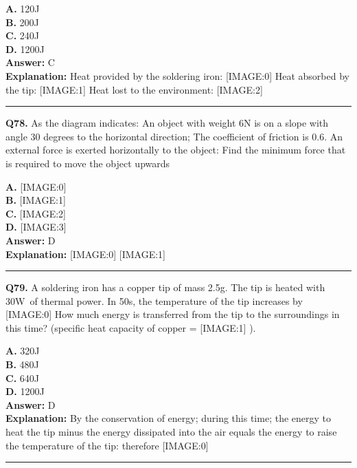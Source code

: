 \documentclass[12pt]{article}
\begin{document}
\textbf{A.} 120J \\
\textbf{B.} 200J \\
\textbf{C.} 240J \\
\textbf{D.} 1200J \\

\textbf{Answer:} C \\
\textbf{Explanation:} Heat provided by the soldering iron:
[IMAGE:0]
Heat absorbed by the tip:
[IMAGE:1]
Heat lost to the environment:
[IMAGE:2]

\hrule
\vspace{1em}


\noindent
\textbf{Q78.} As the diagram indicates: An object with weight 6N is on a slope with angle 30 degrees to the horizontal direction; The coefficient of friction is 0.6. An external force is exerted horizontally to the object: Find the minimum force that is required to move the object upwards



\textbf{A.} [IMAGE:0] \\
\textbf{B.} [IMAGE:1] \\
\textbf{C.} [IMAGE:2] \\
\textbf{D.} [IMAGE:3] \\

\textbf{Answer:} D \\
\textbf{Explanation:} [IMAGE:0]
[IMAGE:1]

\hrule
\vspace{1em}


\noindent
\textbf{Q79.} A soldering iron has a copper tip of mass 2.5g.
The tip is heated with 30W of thermal power. In 50s, the temperature of the tip increases by
[IMAGE:0]
How much energy is transferred from the tip to the surroundings in this time? (specific heat capacity of copper =
[IMAGE:1]
).



\textbf{A.} 320J \\
\textbf{B.} 480J \\
\textbf{C.} 640J \\
\textbf{D.} 1200J \\

\textbf{Answer:} D \\
\textbf{Explanation:} By the conservation of energy; during this time; the energy to heat the tip minus the energy dissipated into the air equals the energy to raise the temperature of the tip: therefore
[IMAGE:0]

\hrule
\vspace{1em}
\end{document}
